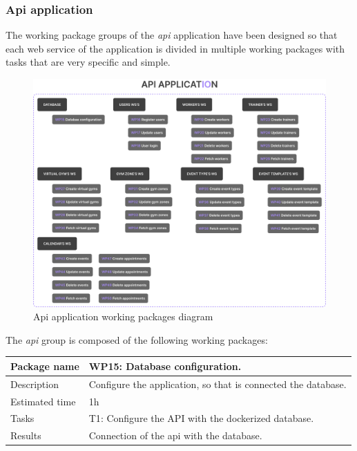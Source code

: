 \documentclass[a4paper, 12pt, oneside]{book}
\begin{document}
\subsubsection{Api application}
\label{working-packages-api}
The working package groups of the \emph{api} application have been designed so that each web service of the application is divided in multiple working packages with tasks that are very specific and simple.
\begin{figure}[H]
	\centering
	\includegraphics[width=\textwidth]{assets/working-packages/Api.png}
	\caption{Api application working packages diagram}
\end{figure}
The \emph{api} group is composed of the following working packages:
\\[8pt]
\begin{tabularx}{\textwidth}{| l | X |}
	\hline
	\rowcolor{rowColor}
	{\semibf Package name}   & {\semibf WP15}: Database configuration.                       \\
	\hline
	{\semibf Description}    & Configure the application, so that is connected the database. \\
	\hline
	\rowcolor{rowColor}
	{\semibf Estimated time} & 1h                                                            \\
	\hline
	{\semibf Tasks}          & {\semibf T1}: Configure the API with the dockerized database. \\
	\hline
	\rowcolor{rowColor}
	{\semibf Results}        & Connection of the api with the database.                      \\
	\hline
\end{tabularx}
\end{document}

